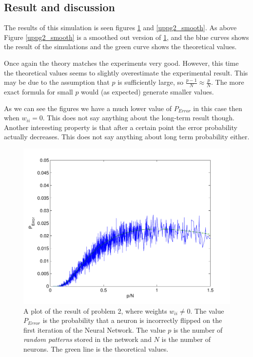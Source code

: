 \documentclass[12pt,a4paper]{article}
\begin{document}
\subsection{Result and discussion}
The results of this simulation is seen figures \ref{uppg2} and
\ref{uppg2_smooth}. As above Figure \ref{uppg2_smooth} is a smoothed out
version of \ref{uppg2}, and the blue curves shows the result of the
simulations and the green curve shows the theoretical values.

Once again the theory matches the experiments very good. However, this time
the theoretical values seems to slightly overestimate the experimental
result. This may be due to the assumption that $p$ is sufficiently large, so
$\frac{p-1}{N} \approx \frac{p}{N}$. The more exact formula for small $p$ would (as expected) generate smaller values.

As we can see the figures we have a much lower value of $P_{Error}$ in this
case then when $w_{ii} =0$. This does not say anything about the long-term
result though. Another interesting property is that after a certain point
the error probability actually decreases. This does not say anything about
long term probability either.

\begin{figure}\centering
\includegraphics[width=12cm]{uppg2.pdf}
\caption{\label{uppg2} A plot of the result of problem 2, where weights
$w_{ii} \neq 0$. The value $P_{Error}$ is the probability that a neuron is
incorrectly flipped on the first iteration of the Neural Network.  The value
$p$ is the number of \emph{random patterns} stored in the network and $N$ is
the number of neurons. The green line is the theoretical values.}
\end{figure}
\end{document}
